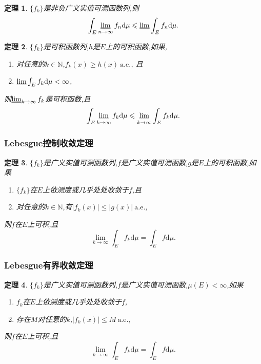 \documentclass[12pt,a4paper,oneside]{ctexart}
\theoremstyle{nonumberplain}
\theoremstyle{plain}
\newtheorem{theorem}{定理}[section]
\theoremstyle{plain}
\theoremstyle{nonumberplain}
\theoremstyle{plain}
\theoremstyle{plain}
\theoremstyle{plain}
\theoremstyle{plain}
\newcommand{\dif}{\mathrm{d}}
\newcommand{\N}{\mathbb{N}}
\renewcommand{\ae}{\mbox{a.e.}}
\begin{document}
    \begin{theorem}
        $\{f_k\}$是非负广义实值可测函数列,则
        \begin{equation*}
            \int_E\varliminf_{n\to\infty}f_n\dif\mu\leqslant\varliminf\int_E f_n\dif\mu.
        \end{equation*}
    \end{theorem}

    \begin{theorem}
        $\{f_k\}$是可积函数列,$h$是$E$上的可积函数,如果,
        \begin{enumerate}
            \item 对任意的$k\in\N$,$f_k(x)\geqslant h(x)\ \ae$, 且
            \item $\varliminf\int_E f_k\dif\mu<\infty$,
        \end{enumerate}
        则$\varliminf_{k\to\infty} f_k$是可积函数,且 
        \begin{equation*}
            \int_E\varliminf_{k\to\infty}f_k\dif\mu\leqslant\varliminf_{k\to\infty}\int_Ef_k\dif\mu.
        \end{equation*}
    \end{theorem}

    \subsubsection{Lebesgue控制收敛定理}

    \begin{theorem}
        $\{f_k\}$是广义实值可测函数列,$f$是广义实值可测函数,$g$是$E$上的可积函数,如果 
        \begin{enumerate}
            \item $\{f_k\}$在$E$上依测度或几乎处处收敛于$f$,且
            \item 对任意的$k\in\N$,有$|f_k(x)|\leqslant |g(x)|\ \ae$,
        \end{enumerate}
        则$f$在$E$上可积,且
        \begin{equation*}
            \lim_{k\to\infty}\int_E f_k\dif\mu=\int_E f\dif\mu.
        \end{equation*}
    \end{theorem}

    \subsubsection{Lebesgue有界收敛定理}

    \begin{theorem}
        $\{f_k\}$是广义实值可测函数列,$f$是广义实值可测函数,$\mu(E)<\infty$,如果 
        \begin{enumerate}
            \item $f_k$在$E$上依测度或几乎处处收敛于$f$,
            \item 存在$M$对任意的$k$,$|f_k(x)|\leqslant M\ \ae$,
        \end{enumerate}
        则$f$在$E$上可积,且
        \begin{equation*}
            \lim_{k\to\infty}\int_E f_k\dif\mu=\int_E f\dif\mu.
        \end{equation*}
    \end{theorem}
\end{document}

